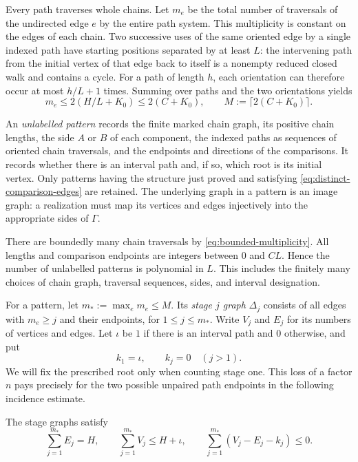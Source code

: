 Every path traverses whole chains.  Let $m_e$ be the total number of
traversals of the undirected edge $e$ by the entire path system.  This
multiplicity is constant on the edges of each chain.  Two successive
uses of the same oriented edge by a single indexed path have starting
positions separated by at least $L$: the intervening path from the
initial vertex of that edge back to itself is a nonempty reduced closed
walk and contains a cycle.  For a path of length $h$, each orientation
can therefore occur at most $h/L+1$ times.  Summing over paths and the
two orientations yields
\begin{equation}\label{eq:bounded-multiplicity}
 m_e\leq2(H/L+K_0)\leq2(C+K_0),\qquad
 M:=\lceil2(C+K_0)\rceil.
\end{equation}

An \emph{unlabelled pattern} records the finite marked chain graph,
its positive chain lengths, the side $A$ or $B$ of each component,
the indexed paths as sequences of oriented chain traversals, and the
endpoints and directions of the comparisons.  It records whether there
is an interval path and, if so, which root is its initial vertex.
Only patterns having the structure just proved and satisfying
\eqref{eq:distinct-comparison-edges} are retained.  The underlying graph
in a pattern is an image graph: a realization must map its vertices and
edges injectively into the appropriate sides of $\Gamma$.

There are boundedly many chain traversals by
\eqref{eq:bounded-multiplicity}.  All lengths and comparison endpoints
are integers between $0$ and $CL$.  Hence the number of unlabelled
patterns is polynomial in $L$.  This includes the finitely many choices
of chain graph, traversal sequences, sides, and interval designation.

For a pattern, let $m_*:=\max_e m_e\leq M$.  Its \emph{stage $j$ graph}
$\Delta_j$ consists of all edges with $m_e\geq j$ and their endpoints,
for $1\leq j\leq m_*$.  Write $V_j$ and $E_j$ for its numbers of vertices
and edges.  Let $\iota$ be $1$ if there is an interval path and $0$
otherwise, and put
\[
 k_1=\iota,\qquad k_j=0\quad(j>1).
\]
We will fix the prescribed root only when counting stage one.  This
loss of a factor $n$ pays precisely for the two possible unpaired path
endpoints in the following incidence estimate.

\begin{lemma}\label{lem:multiplicity-incidence}
The stage graphs satisfy
\begin{equation}\label{eq:stage-incidence}
 \sum_{j=1}^{m_*}E_j=H,\qquad
 \sum_{j=1}^{m_*}V_j\leq H+\iota,\qquad
 \sum_{j=1}^{m_*}(V_j-E_j-k_j)\leq0.
\end{equation}
\end{lemma}

